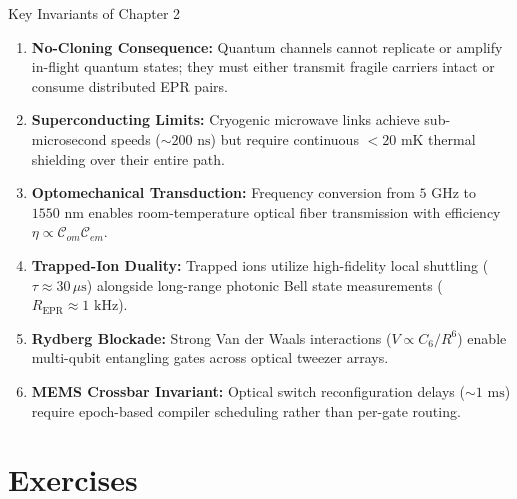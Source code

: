 \begin{summarybox}{Key Invariants of Chapter 2}
\begin{enumerate}
    \item \textbf{No-Cloning Consequence:} Quantum channels cannot replicate or amplify in-flight quantum states; they must either transmit fragile carriers intact or consume distributed EPR pairs.
    \item \textbf{Superconducting Limits:} Cryogenic microwave links achieve sub-microsecond speeds ($\sim 200\text{ ns}$) but require continuous $<20\text{ mK}$ thermal shielding over their entire path.
    \item \textbf{Optomechanical Transduction:} Frequency conversion from $5\text{ GHz}$ to $1550\text{ nm}$ enables room-temperature optical fiber transmission with efficiency $\eta \propto \mathcal{C}_{om} \mathcal{C}_{em}$.
    \item \textbf{Trapped-Ion Duality:} Trapped ions utilize high-fidelity local shuttling ($\tau \approx 30\,\mu\text{s}$) alongside long-range photonic Bell state measurements ($R_{\text{EPR}} \approx 1\text{ kHz}$).
    \item \textbf{Rydberg Blockade:} Strong Van der Waals interactions ($V \propto C_6/R^6$) enable multi-qubit entangling gates across optical tweezer arrays.
    \item \textbf{MEMS Crossbar Invariant:} Optical switch reconfiguration delays ($\sim 1\text{ ms}$) require epoch-based compiler scheduling rather than per-gate routing.
\end{enumerate}
\end{summarybox}


\section*{Exercises}

